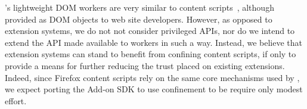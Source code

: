 %
\sys{}'s lightweight DOM workers are very similar to content
scripts~\cite{Carlini:2012}, although provided as DOM objects to
web site developers.
%
However, as opposed to extension systems, we do not not consider
privileged APIs, nor do we intend to extend the API made available to
workers in such a way.
%
Instead, we believe that extension systems can stand to benefit from
confining content scripts, if only to provide a means for further
reducing the trust placed on existing extensions.
%
Indeed, since Firefox content scripts rely on the same core mechanisms
used by \sys{}, we expect porting the Add-on SDK to use confinement to
be require only modest effort.
 

